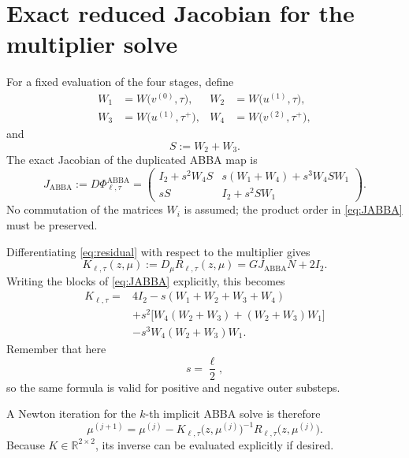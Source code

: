 \documentclass[11pt,a4paper]{article}
\newcommand{\RR}{\mathbb{R}}
\newcommand{\ABBA}{\operatorname{ABBA}}
\newcommand{\Id}{I_2}
\newcommand{\PhiA}{\Phi^{\mathrm{ABBA}}}
\begin{document}
\section{Exact reduced Jacobian for the multiplier solve}
For a fixed evaluation of the four stages, define
\begin{align}
    W_1&=W\bigl(v^{(0)},\tau\bigr),
    &W_2&=W\bigl(u^{(1)},\tau\bigr),\\
    W_3&=W\bigl(u^{(1)},\tau^+\bigr),
    &W_4&=W\bigl(v^{(2)},\tau^+\bigr),
\end{align}
and
\begin{equation}
    S:=W_2+W_3.
\end{equation}
The exact Jacobian of the duplicated ABBA map is
\begin{equation}
    J_{\ABBA}
    :=D\PhiA_{\ell,\tau}
    =\begin{pmatrix}
        \Id+s^2W_4S & s(W_1+W_4)+s^3W_4SW_1\\
        sS & \Id+s^2SW_1
    \end{pmatrix}.
    \label{eq:JABBA}
\end{equation}
No commutation of the matrices $W_i$ is assumed; the product order in \eqref{eq:JABBA} must be preserved.

Differentiating \eqref{eq:residual} with respect to the multiplier gives
\begin{equation}
    \boxed{
    K_{\ell,\tau}(z,\mu)
    :=D_\mu R_{\ell,\tau}(z,\mu)
    =GJ_{\ABBA}N+2\Id.
    }
    \label{eq:Kcompact}
\end{equation}
Writing the blocks of \eqref{eq:JABBA} explicitly, this becomes
\begin{equation}
\boxed{
\begin{aligned}
K_{\ell,\tau}
={}&4\Id-s(W_1+W_2+W_3+W_4)\\
&+s^2\bigl[W_4(W_2+W_3)+(W_2+W_3)W_1\bigr]\\
&-s^3W_4(W_2+W_3)W_1.
\end{aligned}}
\label{eq:Kexplicit}
\end{equation}
Remember that here
\begin{equation}
    s=\frac{\ell}{2},
\end{equation}
so the same formula is valid for positive and negative outer substeps.

A Newton iteration for the $k$-th implicit ABBA solve is therefore
\begin{equation}
    \boxed{
    \mu^{(j+1)}
    =\mu^{(j)}-
    K_{\ell,\tau}\bigl(z,\mu^{(j)}\bigr)^{-1}
    R_{\ell,\tau}\bigl(z,\mu^{(j)}\bigr).
    }
    \label{eq:newton}
\end{equation}
Because $K\in\RR^{2\times2}$, its inverse can be evaluated explicitly if desired.
\end{document}
